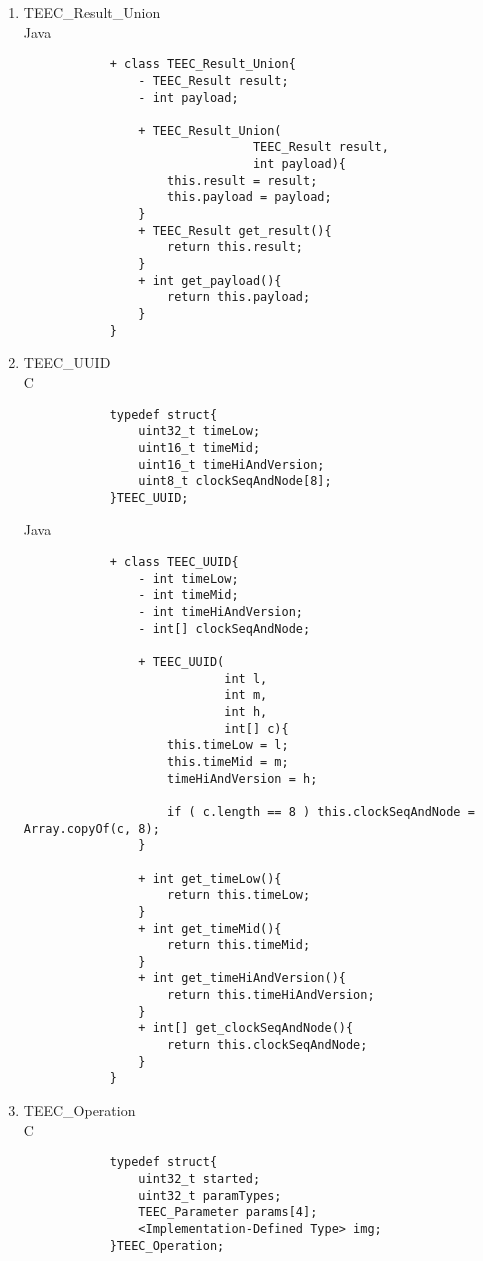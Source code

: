 \documentclass{cseminar}
\begin{document}
\begin{enumerate}
\begin{lstlisting}
				+ TEEC_SharedMemory(
								Byte[] buffer,
								int flags,
								TEEC_IMP imp){
					this.buffer = Arrays.copyOf(buffer, buffer.length());
					this.flags = flags;
					this.imp = imp;
				}
				+ Byte[] get_buffer(){
					return this.buffer;				
				}				
				+ int get_flags(){
					return this.flags;				
				}
				+ TEEC_IMP get_imp(){
					return this.imp;				
				}
				
			}
			\end{lstlisting}
			
	
	\item TEEC\_Result\_Union
			\\Java
			\begin{lstlisting}
			+ class TEEC_Result_Union{
				- TEEC_Result result;
				- int payload;
				
				+ TEEC_Result_Union(
								TEEC_Result result,
								int payload){
					this.result = result;
					this.payload = payload;				
				}
				+ TEEC_Result get_result(){
					return this.result; 				
				}
				+ int get_payload(){
					return this.payload;				
				}
			}
			\end{lstlisting}
	
	\item TEEC\_UUID
			\\C
			\begin{lstlisting}
			typedef struct{
				uint32_t timeLow;
				uint16_t timeMid;
				uint16_t timeHiAndVersion;
				uint8_t clockSeqAndNode[8];			
			}TEEC_UUID;
			\end{lstlisting}
			
			Java
			\begin{lstlisting}
			+ class TEEC_UUID{
				- int timeLow;
				- int timeMid;
				- int timeHiAndVersion;
				- int[] clockSeqAndNode;
				
				+ TEEC_UUID(
							int l,
							int m,
							int h,
							int[] c){
					this.timeLow = l;
					this.timeMid = m;
					timeHiAndVersion = h;
					
					if ( c.length == 8 ) this.clockSeqAndNode = Array.copyOf(c, 8);				
				}
				
				+ int get_timeLow(){
					return this.timeLow;				
				}			
				+ int get_timeMid(){
					return this.timeMid;				
				}
				+ int get_timeHiAndVersion(){
					return this.timeHiAndVersion;				
				}
				+ int[] get_clockSeqAndNode(){
					return this.clockSeqAndNode;				
				}
			}
			\end{lstlisting}
	\item TEEC\_Operation
			\\C
			\begin{lstlisting}
			typedef struct{
				uint32_t started;
				uint32_t paramTypes;
				TEEC_Parameter params[4];
				<Implementation-Defined Type> img;
			}TEEC_Operation;
			\end{lstlisting}
			

\end{enumerate}
\end{document}
